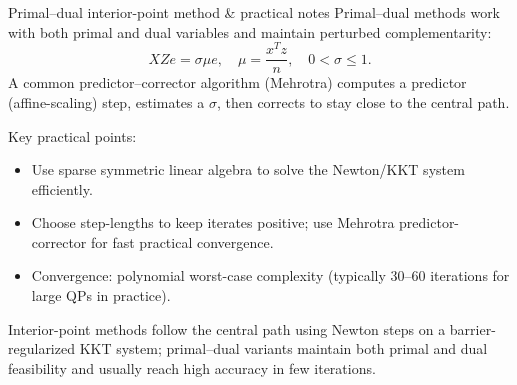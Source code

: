\begin{frame}{Primal--dual interior-point method \& practical notes}
Primal--dual methods work with both primal and dual variables and maintain perturbed complementarity:
\[XZ e = \sigma \mu e,\quad \mu=\frac{x^T z}{n},\quad 0<\sigma\le1.
\]
A common predictor--corrector algorithm (Mehrotra) computes a predictor (affine-scaling) step, estimates a \(\sigma\), then corrects to stay close to the central path.

Key practical points:
\begin{itemize}
  \item Use sparse symmetric linear algebra to solve the Newton/KKT system efficiently.
  \item Choose step-lengths to keep iterates positive; use Mehrotra predictor-corrector for fast practical convergence.
  \item Convergence: polynomial worst-case complexity (typically 30--60 iterations for large QPs in practice).
\end{itemize}

Interior-point methods follow the central path using Newton steps on a barrier-regularized KKT system; primal--dual variants maintain both primal and dual feasibility and usually reach high accuracy in few iterations.
\end{frame}





